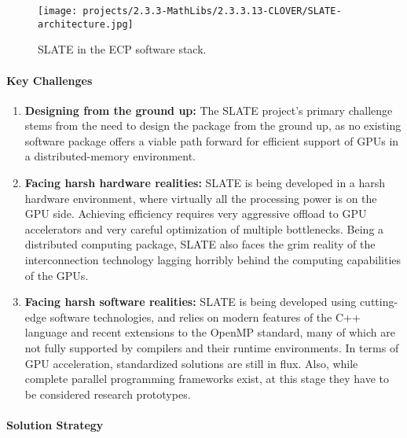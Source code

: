 \begin{figure}[htb]
    \centering
    \texttt{[image: projects/2.3.3-MathLibs/2.3.3.13-CLOVER/SLATE-architecture.jpg]}
    \caption{\label{fig:slate-architecture}
    SLATE in the ECP software stack.}
\end{figure}

\paragraph{Key  Challenges}

\begin{enumerate}
\item
\textbf{Designing from the ground up:}
The SLATE project's primary challenge stems from the need to design the package
from the ground up, as no existing software package offers
a viable path forward for efficient support of GPUs
in a distributed-memory environment.
\item
\textbf{Facing harsh hardware realities:}
SLATE is being developed in a harsh hardware environment, where virtually
all the processing power is on the GPU side.
Achieving efficiency requires very aggressive offload to GPU accelerators
and very careful optimization of multiple bottlenecks.
Being a distributed computing package, SLATE also faces the grim reality
of the interconnection technology lagging horribly behind the computing
capabilities of the GPUs.
\item
\textbf{Facing harsh software realities:}
SLATE is being developed using cutting-edge software technologies,
and relies on modern features of the C++ language and recent extensions
to the OpenMP standard, many of which are not fully supported by compilers
and their runtime environments.
In terms of GPU acceleration, standardized solutions are still in flux.
Also, while complete parallel programming frameworks exist, at this stage
they have to be considered research prototypes.
\end{enumerate}

\paragraph{Solution Strategy}

